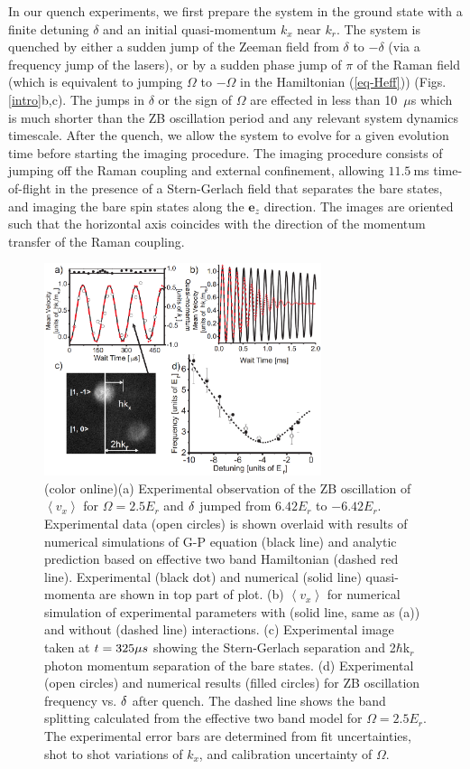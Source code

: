 \documentclass[prl,aps,twocolumn,showpacs,floatfix]{revtex4-1}
\begin{document}
In our quench experiments, we first prepare the system in the ground state
with a finite detuning $\delta $ and an initial quasi-momentum $k_{x}$ near $%
k_{r}$. The system is quenched by either a sudden jump of the Zeeman field
from $\delta $ to $-\delta $ (via a frequency jump of the lasers), or by a
sudden phase jump of $\pi $ of the Raman field (which is equivalent to
jumping $\Omega $ to $-\Omega $ in the Hamiltonian (\ref{eq-Heff})) (Figs.~%
\ref{intro}b,c). The jumps in $\delta $ or the sign of $\Omega $ are
effected in less than 10~$\mu $s which is much shorter than the ZB
oscillation period and any relevant system dynamics timescale. After the
quench, we allow the system to evolve for a given evolution time before
starting the imaging procedure. The imaging procedure consists of jumping
off the Raman coupling and external confinement, allowing $11.5~$ms
time-of-flight in the presence of a Stern-Gerlach field that separates the
bare states, and imaging the bare spin states along the $\mathbf{e}_{z}$
direction. The images are oriented such that the horizontal axis coincides
with the direction of the momentum transfer of the Raman coupling.

\begin{figure}[tbp]
\centering
\includegraphics[width=3.2in]{Fig2QuPRL.eps}
\caption{(color online)(a) Experimental observation of the ZB oscillation of
$\left\langle v_{x}\right\rangle $ for $\Omega =2.5E_{r}$ and $\protect%
\delta $ jumped from $6.42E_{r}$ to $-6.42E_{r}$. Experimental data (open
circles) is shown overlaid with results of numerical simulations of G-P
equation (black line) and analytic prediction based on effective two band
Hamiltonian (dashed red line). Experimental (black dot) and numerical (solid
line) quasi-momenta are shown in top part of plot. (b) $\left\langle
v_{x}\right\rangle $ for numerical simulation of experimental parameters
with (solid line, same as (a)) and without (dashed line) interactions. (c)
Experimental image taken at $t=325{\protect\mu }s$ showing the Stern-Gerlach
separation and 2$\hbar $k$_{r}$ photon momentum separation of the bare
states. (d) Experimental (open circles) and numerical results (filled
circles) for ZB oscillation frequency vs. $\protect\delta $ after quench.
The dashed line shows the band splitting calculated from the effective two
band model for $\Omega =2.5E_{r}$. The experimental error bars are
determined from fit uncertainties, shot to shot variations of $k_{x}$, and
calibration uncertainty of $\Omega $. }
\label{ZB}
\end{figure}
\end{document}
